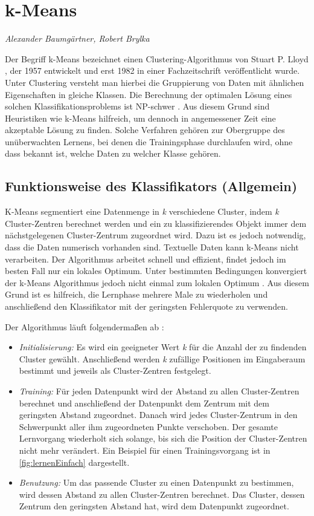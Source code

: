 \section{k-Means}
\textit{Alexander Baumgärtner, Robert Brylka}

Der Begriff k-Means bezeichnet einen Clustering-Algorithmus von Stuart P. Lloyd \cite{Lloyd}, der 1957 entwickelt und erst 1982 in einer Fachzeitschrift veröffentlicht wurde. Unter Clustering versteht man hierbei die Gruppierung von Daten mit ähnlichen Eigenschaften in gleiche Klassen. Die Berechnung der optimalen Lösung eines solchen Klassifikationsproblems ist NP-schwer \cite{kMeansNPhard}. Aus diesem Grund sind Heuristiken wie k-Means hilfreich, um dennoch in angemessener Zeit eine akzeptable Lösung zu finden.
Solche Verfahren gehören zur Obergruppe des unüberwachten Lernens, bei denen die Trainingsphase durchlaufen wird, ohne dass 
bekannt ist, welche Daten zu welcher Klasse gehören.

\subsection{Funktionsweise des Klassifikators (Allgemein)} \label{subsec:kMeansFunktionsweise}
K-Means segmentiert eine Datenmenge in \emph{k} verschiedene Cluster, indem \emph{k} Cluster-Zentren berechnet werden und ein zu klassifizierendes Objekt immer dem nächstgelegenen Cluster-Zentrum zugeordnet wird. Dazu ist es jedoch notwendig, dass die Daten numerisch vorhanden sind. Textuelle Daten kann k-Means nicht verarbeiten.
Der Algorithmus arbeitet schnell und effizient, findet jedoch im besten Fall nur ein lokales Optimum. Unter bestimmten Bedingungen konvergiert der k-Means Algorithmus jedoch nicht einmal zum lokalen Optimum \cite{kMeansMinimum}. Aus diesem Grund ist es hilfreich, die Lernphase mehrere Male zu wiederholen und anschließend den Klassifikator mit der geringsten Fehlerquote zu verwenden.  

Der Algorithmus läuft folgendermaßen ab \cite{Marsland}:
\begin{itemize}

\item \emph{Initialisierung:} Es wird ein geeigneter Wert \emph{k} für die Anzahl der zu findenden Cluster gewählt.
Anschließend werden \emph{k} zufällige Positionen im Eingaberaum bestimmt und jeweils als Cluster-Zentren festgelegt.
\item \emph{Training:} Für jeden Datenpunkt wird der Abstand zu allen Cluster-Zentren berechnet und anschließend der Datenpunkt dem Zentrum mit dem geringsten Abstand zugeordnet. 
Danach wird jedes Cluster-Zentrum in den Schwerpunkt aller ihm zugeordneten Punkte verschoben.
Der gesamte Lernvorgang wiederholt sich solange, bis sich die Position der Cluster-Zentren nicht mehr verändert. 
Ein Beispiel für einen Trainingsvorgang ist in \autoref{fig:lernenEinfach} dargestellt.
\item \emph{Benutzung:} Um das passende Cluster zu einen Datenpunkt zu bestimmen, wird dessen Abstand zu allen Cluster-Zentren berechnet. Das Cluster, dessen Zentrum den geringsten Abstand hat, wird dem Datenpunkt zugeordnet.
\end{itemize}


